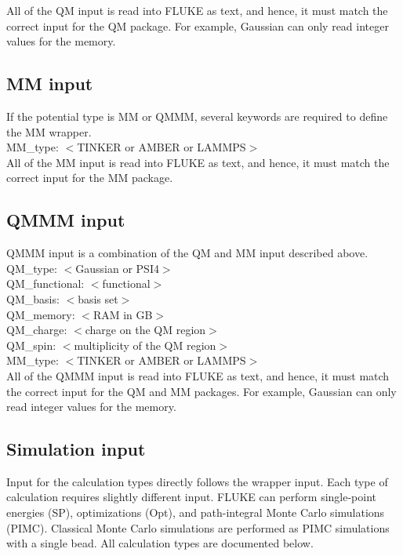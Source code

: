 \documentclass[12pt]{report}
\begin{document}
All of the QM input is read into FLUKE as text, and hence, it must match the
correct input for the QM package. For example, Gaussian can only read integer
values for the memory.

\subsection{MM input}

If the potential type is MM or QMMM, several keywords are required to define
the MM wrapper. \\

MM\_type: $<$TINKER or AMBER or LAMMPS$>$ \\

All of the MM input is read into FLUKE as text, and hence, it must match the
correct input for the MM package.

\subsection{QMMM input}

QMMM input is a combination of the QM and MM input described above. \\

QM\_type: $<$Gaussian or PSI4$>$ \\
QM\_functional: $<$functional$>$ \\
QM\_basis: $<$basis set$>$ \\
QM\_memory: $<$RAM in GB$>$ \\
QM\_charge: $<$charge on the QM region$>$ \\
QM\_spin: $<$multiplicity of the QM region$>$ \\
MM\_type: $<$TINKER or AMBER or LAMMPS$>$ \\

All of the QMMM input is read into FLUKE as text, and hence, it must match the
correct input for the QM and MM packages. For example, Gaussian can only read
integer values for the memory.

\subsection{Simulation input}

Input for the calculation types directly follows the wrapper input. Each type
of calculation requires slightly different input. FLUKE can perform
single-point energies (SP), optimizations (Opt), and path-integral Monte Carlo
simulations (PIMC). Classical Monte Carlo simulations are performed as PIMC
simulations with a single bead. All calculation types are documented below. \\
\end{document}
